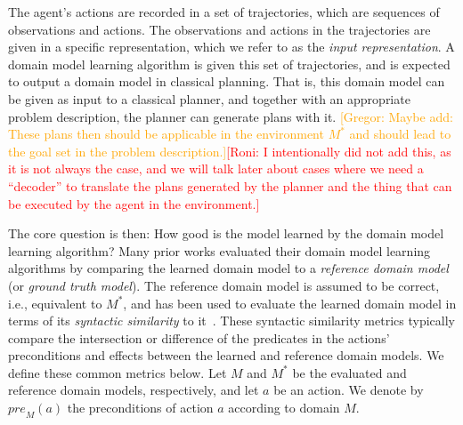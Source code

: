 \documentclass{article}
\theoremstyle{definition}
\theoremstyle{remark}
\newcommand{\realm}{\ensuremath{M^*}\xspace}
\newcommand{\pre}{\ensuremath{\textit{pre}}\xspace}
\newcommand{\roni}[1]{{\textcolor{red}{[Roni: #1]}}}
\newcommand{\mauro}[1]{{\textcolor{green}{[Mauro: #1]}}}
\newcommand{\gregor}[1]{{\textcolor{orange}{[Gregor: #1]}}}
\begin{document}
The agent's actions are recorded in a set of trajectories, which are sequences of observations and actions. 
The observations and actions in the trajectories are given in a specific representation, which we refer to as the \emph{input representation}. 
A domain model learning algorithm is given this set of trajectories, and is expected to output a domain model in classical planning. 
That is, this domain model can be given as input to a classical planner, and together with an appropriate problem description, the planner can generate plans with it.
\gregor{Maybe add: These plans then should be applicable in the environment $\realm$ and should lead to the goal set in the problem description.}\roni{I intentionally did not add this, as it is not always the case, and we will talk later about cases where we need a ``decoder'' to translate the plans generated by the planner and the thing that can be executed by the agent in the environment.}


The core question is then: How good is the model learned by the domain model learning algorithm?
Many prior works evaluated their domain model learning algorithms by comparing the learned domain model to a \emph{reference domain model} (or \emph{ground truth model}). 
The reference domain model is assumed to be correct, i.e., equivalent to \realm, 
and has been used to evaluate the learned domain model in terms of its \emph{syntactic similarity} to it~\citep{aineto2019learning,mordoch2023safe,xi2024neuro,Oswald2024DLLMDomainModeling}.
These syntactic similarity metrics typically compare the intersection or difference of the predicates in the actions' preconditions and effects between the learned and reference domain models. We define these common metrics below. 
Let $M$ and $\realm$ be the evaluated and reference domain models, respectively, and let $a$ be an action. We denote by $\pre_M(a)$ the preconditions of action $a$ according to domain $M$.
\end{document}
